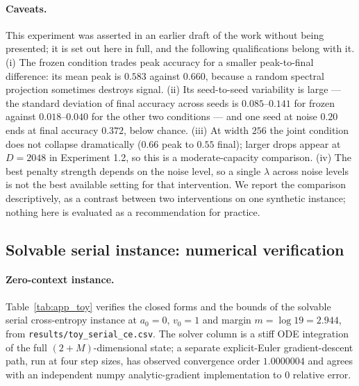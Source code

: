 \paragraph{Caveats.} This experiment was asserted in an earlier draft of the
work without being presented; it is set out here in full, and the following
qualifications belong with it. (i) The frozen condition trades peak accuracy
for a smaller peak-to-final difference: its mean peak is $0.583$ against
$0.660$, because a random spectral projection sometimes destroys signal.
(ii) Its seed-to-seed variability is large --- the standard deviation of final
accuracy across seeds is $0.085$--$0.141$ for frozen against $0.018$--$0.040$
for the other two conditions --- and one seed at noise $0.20$ ends at final
accuracy $0.372$, below chance. (iii) At width $256$ the joint condition does
not collapse dramatically ($0.66$ peak to $0.55$ final); larger drops appear at
$D = 2048$ in Experiment 1.2, so this is a moderate-capacity comparison.
(iv) The best penalty strength depends on the noise level, so a single
$\lambda$ across noise levels is not the best available setting for that
intervention. We report the comparison descriptively, as a contrast between
two interventions on one synthetic instance; nothing here is evaluated as a
recommendation for practice.

\subsection{Solvable serial instance: numerical verification}
\label{app:toy}

\paragraph{Zero-context instance.} Table~\ref{tab:app_toy} verifies the closed
forms and the bounds of the solvable serial cross-entropy instance at
$a_0 = 0$, $v_0 = 1$ and margin $m = \log 19 = 2.944$, from
\texttt{results/toy\_serial\_ce.csv}. The solver column is a stiff ODE
integration of the full $(2+M)$-dimensional state; a separate explicit-Euler
gradient-descent path, run at four step sizes, has observed convergence order
$1.0000004$ and agrees with an independent numpy analytic-gradient
implementation to $0$ relative error.

